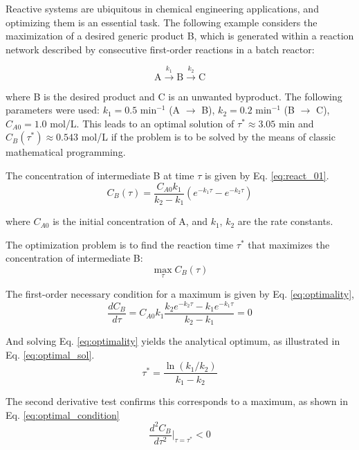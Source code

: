 \documentclass{achemso}
\begin{document}
Reactive systems are ubiquitous in chemical engineering applications, and optimizing them is an essential task. The following example considers the maximization of a desired generic product B, which is generated within a reaction network described by consecutive first-order reactions in a batch reactor:

\begin{equation}
\mathrm{A} \xrightarrow{k_1} \mathrm{B} \xrightarrow{k_2} \mathrm{C}
\end{equation}

\noindent where B is the desired product and C is an unwanted byproduct. The following parameters were used:
\(k_1 = 0.5\) min\(^{-1}\) (A \(\rightarrow\) B), \(k_2 = 0.2\) min\(^{-1}\) (B \(\rightarrow\) C), \(C_{A0} = 1.0\) mol/L. This leads to an optimal solution of \(\tau^* \approx 3.05\) min and \(C_B(\tau^*) \approx 0.543\) mol/L if the problem is to be solved by the means of classic mathematical programming.

The concentration of intermediate B at time \(\tau\) is given by Eq. \ref{eq:react_01}.
\begin{equation} \label{eq:react_01}
C_B(\tau) = \frac{C_{A0} k_1}{k_2 - k_1} \left(e^{-k_1\tau} - e^{-k_2\tau}\right)
\end{equation}

\noindent where \(C_{A0}\) is the initial concentration of A, and \(k_1\), \(k_2\) are the rate constants.

The optimization problem is to find the reaction time \(\tau^*\) that maximizes the concentration of intermediate B:
\begin{equation}
\max_{\tau} C_B(\tau)
\end{equation}

\noindent The first-order necessary condition for a maximum is given by Eq. \ref{eq:optimality},
\begin{equation}
\frac{dC_B}{d\tau} = C_{A0} k_1 \frac{k_2 e^{-k_2\tau} - k_1 e^{-k_1\tau}}{k_2 - k_1} = 0
\label{eq:optimality}
\end{equation}

\noindent And solving Eq. \ref{eq:optimality} yields the analytical optimum, as illustrated in Eq. \ref{eq:optimal_sol}.
\begin{equation} \label{eq:optimal_sol}
\tau^* = \frac{\ln(k_1/k_2)}{k_1 - k_2}
\end{equation}

\noindent The second derivative test confirms this corresponds to a maximum, as shown in Eq. \ref{eq:optimal_condition}
\begin{equation} \label{eq:optimal_condition}
\frac{d^2C_B}{d\tau^2}\bigg|_{\tau=\tau^*} < 0
\end{equation}
\end{document}
